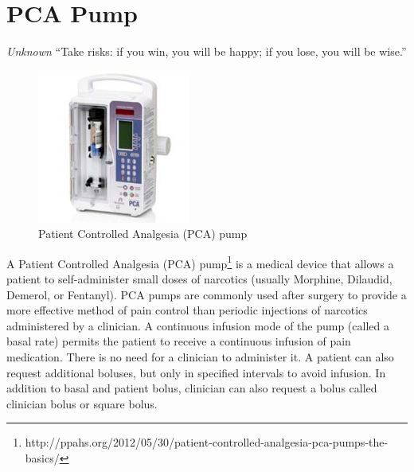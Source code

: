 
\cleardoublepage


\chapter{PCA Pump}
\label{pcapump}

\begin{chapquote}{\textit{Unknown}}
``Take risks: if you win, you will be happy; if you lose, you will be wise.''
\end{chapquote}


\begin{figure}
  \begin{center}
    \includegraphics[width=0.45\textwidth]{figures/pca-pump.png}
  \end{center}
  \caption{Patient Controlled Analgesia (PCA) pump}
  \label{figure:pca-pump}
\end{figure}

A Patient Controlled Analgesia (PCA) pump\footnote{http://ppahs.org/2012/05/30/patient-controlled-analgesia-pca-pumps-the-basics/} is a medical device that allows a patient to self-administer small doses of narcotics (usually Morphine, Dilaudid, Demerol, or Fentanyl). PCA pumps are commonly used after surgery to provide a more effective method of pain control than periodic injections of narcotics administered by a clinician. A continuous infusion mode of the pump (called a basal rate) permits the patient to receive a continuous infusion of pain medication. There is no need for a clinician to administer it. A patient can also request additional boluses, but only in specified intervals to avoid infusion. In addition to basal and patient bolus, clinician can also request a bolus called clinician bolus or square bolus. 

